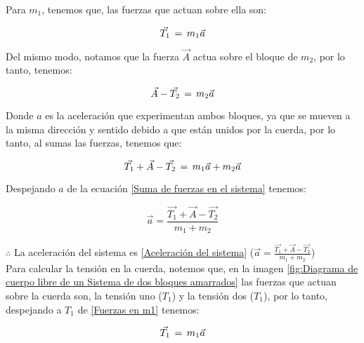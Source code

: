 \documentclass[letterpaper, 12pt]{article}
\begin{document}
\begin{enumerate}
    Para $m_{1}$, tenemos que, las fuerzas que actuan sobre ella son: 
    
    \begin{equation}
        \label{Fuerzas en m1}
        \vec{T_{1}} \thinspace = \thinspace m_{1} \vec{a}
    \end{equation}
    
    Del mismo modo, notamos que la fuerza $\vec{A}$ actua sobre el bloque de $m_{2}$, por lo tanto, tenemos:
    
    \begin{equation}
        \label{Fuerzas en m2}
        \vec{A} - \vec{T_{2}} \thinspace = \thinspace m_{2} \vec{a}
    \end{equation}
    
    Donde $a$ es la aceleración que experimentan ambos bloques, ya que se mueven a la misma dirección y sentido debido a que están unidos por la cuerda, por lo tanto, al sumas las fuerzas, tenemos que: 
    
    \begin{equation}
        \label{Suma de fuerzas en el sistema}
        \vec{T_{1}} + \vec{A} - \vec{T_{2}} \thinspace = \thinspace m_{1} \vec{a} + m_{2}\vec{a} 
    \end{equation}
    
    Despejando $a$ de la ecuación \ref{Suma de fuerzas en el sistema} tenemos: 
    
    \begin{equation}
        \label{Aceleración del sistema}
        \vec{a} = \frac{\vec{T_{1}} + \vec{A} - \vec{T_{2}}}{m_{1} + m_{2}} 
    \end{equation}
    
    $\therefore$ \thinspace La aceleración del sistema es \ref{Aceleración del sistema} ($\vec{a} = \frac{\vec{T_{1}} + \vec{A} - \vec{T_{2}}}{m_{1} + m_{2}}$) \\
    
    Para calcular la tensión en la cuerda, notemos que, en la imagen \ref{fig:Diagrama de cuerpo libre de un Sistema de dos bloques amarrados} las fuerzas que actuan sobre la cuerda son, la tensión uno ($T_{1}$) y la tensión dos ($T_{1}$), por lo tanto, despejando a $T_{1}$ de \ref{Fuerzas en m1} tenemos:
    
    \begin{equation}
        \label{T1 despejado}
        \vec{T_{1}} \thinspace = \thinspace m_{1} \vec{a}
    \end{equation}
    

\end{enumerate}
\end{document}
